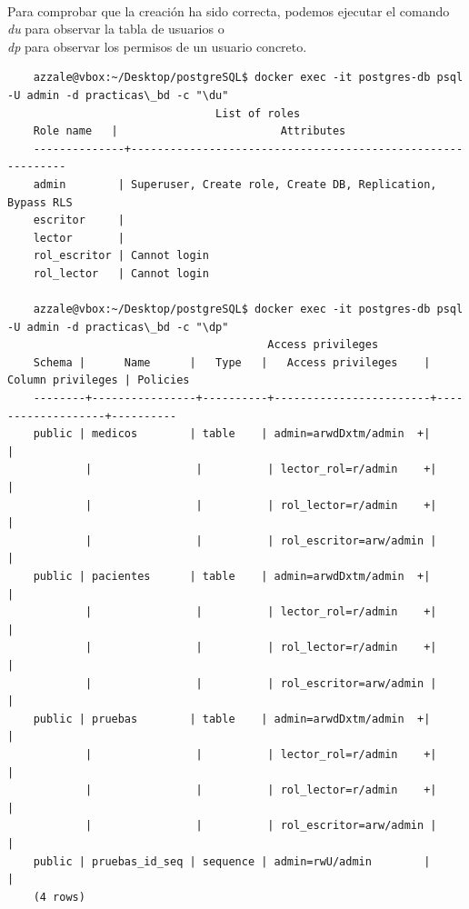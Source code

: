 \documentclass{article}
\begin{document}
\\
Para comprobar que la creación ha sido correcta, podemos ejecutar el comando \textit{\\du} para observar la tabla de usuarios o \textit{\\dp} para observar los permisos de un usuario concreto.
\begin{tcolorbox}[colback=black, coltext=white, fontupper=\ttfamily, title=Terminal]
\begin{verbatim}
    azzale@vbox:~/Desktop/postgreSQL$ docker exec -it postgres-db psql -U admin -d practicas\_bd -c "\du"
                                List of roles
    Role name   |                         Attributes                         
    --------------+------------------------------------------------------------
    admin        | Superuser, Create role, Create DB, Replication, Bypass RLS
    escritor     | 
    lector       | 
    rol_escritor | Cannot login
    rol_lector   | Cannot login

    azzale@vbox:~/Desktop/postgreSQL$ docker exec -it postgres-db psql -U admin -d practicas\_bd -c "\dp"
                                        Access privileges
    Schema |      Name      |   Type   |   Access privileges    | Column privileges | Policies 
    --------+----------------+----------+------------------------+-------------------+----------
    public | medicos        | table    | admin=arwdDxtm/admin  +|                   | 
            |                |          | lector_rol=r/admin    +|                   | 
            |                |          | rol_lector=r/admin    +|                   | 
            |                |          | rol_escritor=arw/admin |                   | 
    public | pacientes      | table    | admin=arwdDxtm/admin  +|                   | 
            |                |          | lector_rol=r/admin    +|                   | 
            |                |          | rol_lector=r/admin    +|                   | 
            |                |          | rol_escritor=arw/admin |                   | 
    public | pruebas        | table    | admin=arwdDxtm/admin  +|                   | 
            |                |          | lector_rol=r/admin    +|                   | 
            |                |          | rol_lector=r/admin    +|                   | 
            |                |          | rol_escritor=arw/admin |                   | 
    public | pruebas_id_seq | sequence | admin=rwU/admin        |                   | 
    (4 rows)
\end{verbatim}
\end{tcolorbox}
\end{document}
